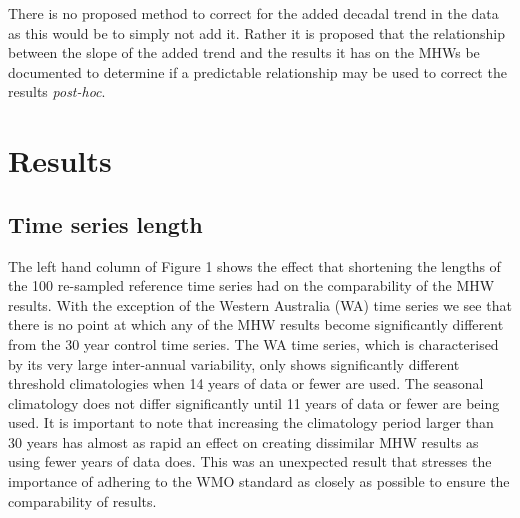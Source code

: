 \documentclass[]{article}
\begin{document}
There is no proposed method to correct for the added decadal trend in
the data as this would be to simply not add it. Rather it is proposed
that the relationship between the slope of the added trend and the
results it has on the MHWs be documented to determine if a predictable
relationship may be used to correct the results \emph{post-hoc}.

\hypertarget{results}{%
\section{Results}\label{results}}

\hypertarget{time-series-length}{%
\subsection{Time series length}\label{time-series-length}}

The left hand column of Figure 1 shows the effect that shortening the
lengths of the 100 re-sampled reference time series had on the
comparability of the MHW results. With the exception of the Western
Australia (WA) time series we see that there is no point at which any of
the MHW results become significantly different from the 30 year control
time series. The WA time series, which is characterised by its very
large inter-annual variability, only shows significantly different
threshold climatologies when 14 years of data or fewer are used. The
seasonal climatology does not differ significantly until 11 years of
data or fewer are being used. It is important to note that increasing
the climatology period larger than 30 years has almost as rapid an
effect on creating dissimilar MHW results as using fewer years of data
does. This was an unexpected result that stresses the importance of
adhering to the WMO standard as closely as possible to ensure the
comparability of results.
\end{document}
